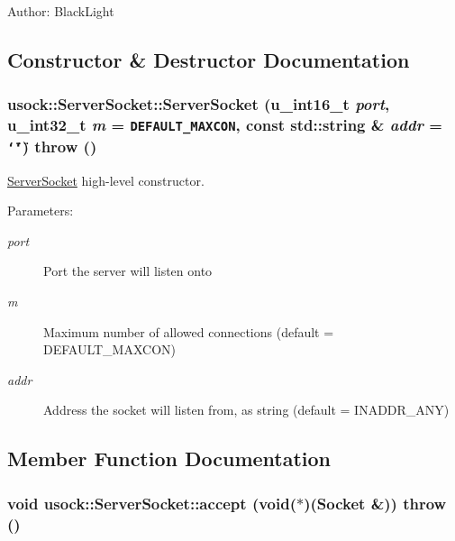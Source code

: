 \begin{Desc}
\item[Author:]BlackLight \end{Desc}


\subsection{Constructor \& Destructor Documentation}
\hypertarget{classusock_1_1ServerSocket_0ac1908d4a4afb675715ae0ad994e870}{
\subsubsection[{ServerSocket}]{\setlength{\rightskip}{0pt plus 5cm}usock::ServerSocket::ServerSocket (u\_\-int16\_\-t {\em port}, \/  u\_\-int32\_\-t {\em m} = {\tt DEFAULT\_\-MAXCON}, \/  const std::string \& {\em addr} = {\tt \char`\"{}\char`\"{}})  throw ()}}
\label{classusock_1_1ServerSocket_0ac1908d4a4afb675715ae0ad994e870}


\hyperlink{classusock_1_1ServerSocket}{ServerSocket} high-level constructor. 

\begin{Desc}
\item[Parameters:]
\begin{description}
\item[{\em port}]Port the server will listen onto \item[{\em m}]Maximum number of allowed connections (default = DEFAULT\_\-MAXCON) \item[{\em addr}]Address the socket will listen from, as string (default = INADDR\_\-ANY) \end{description}
\end{Desc}


\subsection{Member Function Documentation}
\hypertarget{classusock_1_1ServerSocket_99fb8624c4eb79fbed48059f3c7ddfca}{
\subsubsection[{accept}]{\setlength{\rightskip}{0pt plus 5cm}void usock::ServerSocket::accept (void($\ast$)({\bf Socket} \&))  throw ()}}
\label{classusock_1_1ServerSocket_99fb8624c4eb79fbed48059f3c7ddfca}


